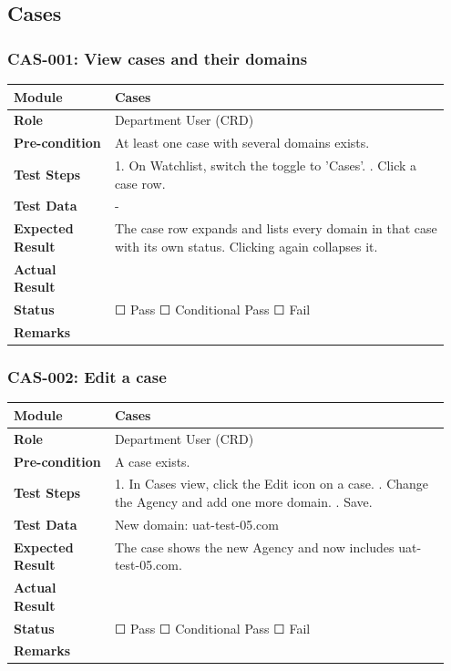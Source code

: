 \documentclass[10pt]{article}
\begin{document}
\subsection{Cases}
\subsubsection*{CAS-001: View cases and their domains}
\begin{longtable}{p{0.22\linewidth}p{0.73\linewidth}}
\hline
\textbf{Module} & Cases \\ \hline
\textbf{Role} & Department User (CRD) \\ \hline
\textbf{Pre-condition} & At least one case with several domains exists. \\ \hline
\textbf{Test Steps} & 1. On Watchlist, switch the toggle to 'Cases'. \newline 2. Click a case row. \\ \hline
\textbf{Test Data} & - \\ \hline
\textbf{Expected Result} & The case row expands and lists every domain in that case with its own status. Clicking again collapses it. \\ \hline
\textbf{Actual Result} & \newline \newline \\ \hline
\textbf{Status} & ☐ Pass \quad ☐ Conditional Pass \quad ☐ Fail \\ \hline
\textbf{Remarks} & \newline \\ \hline
\end{longtable}
\subsubsection*{CAS-002: Edit a case}
\begin{longtable}{p{0.22\linewidth}p{0.73\linewidth}}
\hline
\textbf{Module} & Cases \\ \hline
\textbf{Role} & Department User (CRD) \\ \hline
\textbf{Pre-condition} & A case exists. \\ \hline
\textbf{Test Steps} & 1. In Cases view, click the Edit icon on a case. \newline 2. Change the Agency and add one more domain. \newline 3. Save. \\ \hline
\textbf{Test Data} & New domain: uat-test-05.com \\ \hline
\textbf{Expected Result} & The case shows the new Agency and now includes uat-test-05.com. \\ \hline
\textbf{Actual Result} & \newline \newline \\ \hline
\textbf{Status} & ☐ Pass \quad ☐ Conditional Pass \quad ☐ Fail \\ \hline
\textbf{Remarks} & \newline \\ \hline
\end{longtable}
\end{document}
